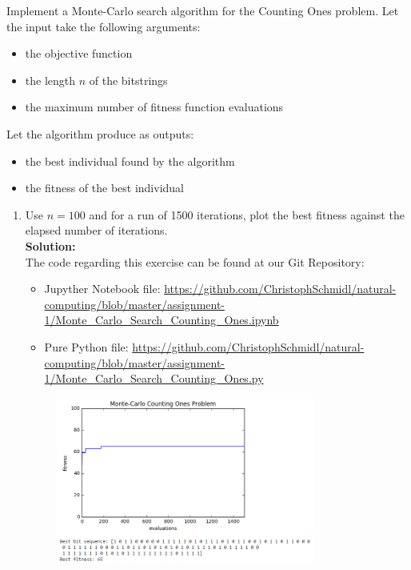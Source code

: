 \documentclass[a4paper]{article}
\begin{document}
\begin{enumerate}
	Implement a Monte-Carlo search algorithm for the Counting Ones problem. Let the input take the following arguments:
	
	\begin{itemize}
		\item the objective function
		\item the length $n$ of the bitstrings
		\item the maximum number of fitness function evaluations
\end{itemize}

Let the algorithm produce as outputs:

\begin{itemize}
	\item the best individual found by the algorithm
	\item the fitness of the best individual
\end{itemize}

\begin{enumerate}
	\item Use $n = 100$ and for a run of 1500 iterations, plot the best fitness against the elapsed number of iterations.\\
	\textbf{Solution:}\\
	
The code regarding this exercise can be found at our Git Repository:

\begin{itemize}
	\item Jupyther Notebook file: \url{https://github.com/ChristophSchmidl/natural-computing/blob/master/assignment-1/Monte_Carlo_Search_Counting_Ones.ipynb}
	\item Pure Python file: \url{https://github.com/ChristophSchmidl/natural-computing/blob/master/assignment-1/Monte_Carlo_Search_Counting_Ones.py}
\end{itemize}	
	
	\begin{figure}[H]
	\centering
  	\includegraphics[width=0.8\textwidth]{images/monte_carlo_1500_iterations.png}
	\end{figure}	
	

\end{enumerate}
\end{enumerate}
\end{document}
